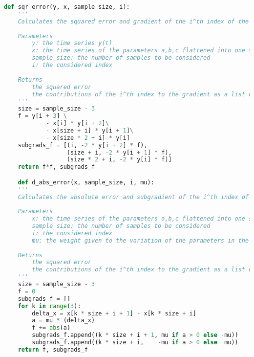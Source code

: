 \documentclass[11pt]{article}
\begin{document}
\begin{lstlisting}[language=Python]
        def sqr_error(y, x, sample_size, i):
    '''
    Calculates the squared error and gradient of the i^th index of the parameters a, b, and c of the autoregressive function with regards to the y time series.
    
    Parameters
        y: the time series y(t)
        x: the time series of the parameters a,b,c flattened into one single vector x
        sample_size: the number of samples to be considered
        i: the considered index
    
    Returns
        the squared error
        the contributions of the i^th index to the gradient as a list of tuples. Each tuple is shaped as (index in the vector x, value of the gradient)
    '''
    size = sample_size - 3
    f = y[i + 3] \
            - x[i] * y[i + 2]\
            - x[size + i] * y[i + 1]\
            - x[size * 2 + i] * y[i]
    subgrads_f = [(i, -2 * y[i + 2] * f),
                  (size + i, -2 * y[i + 1] * f),
                  (size * 2 + i, -2 * y[i] * f)]
    return f*f, subgrads_f

    def d_abs_error(x, sample_size, i, mu):
    '''
    Calculates the absolute error and subgradient of the i^th index of the variation of the parameters a, b, and c.
    
    Parameters
        x: the time series of the parameters a,b,c flattened into one single vector x
        sample_size: the number of samples to be considered
        i: the considered index
        mu: the weight given to the variation of the parameters in the objective function
    
    Returns
        the squared error
        the contributions of the i^th index to the gradient as a list of tuples. Each tuple is shaped as (index in the vector x, value of the gradient)
    '''
    size = sample_size - 3
    f = 0
    subgrads_f = []
    for k in range(3):
        delta_x = x[k * size + i + 1] - x[k * size + i]
        a = mu * (delta_x)
        f += abs(a)
        subgrads_f.append((k * size + i + 1, mu if a > 0 else -mu))
        subgrads_f.append((k * size + i,    -mu if a > 0 else  mu))
    return f, subgrads_f

    \end{lstlisting}
\end{document}
